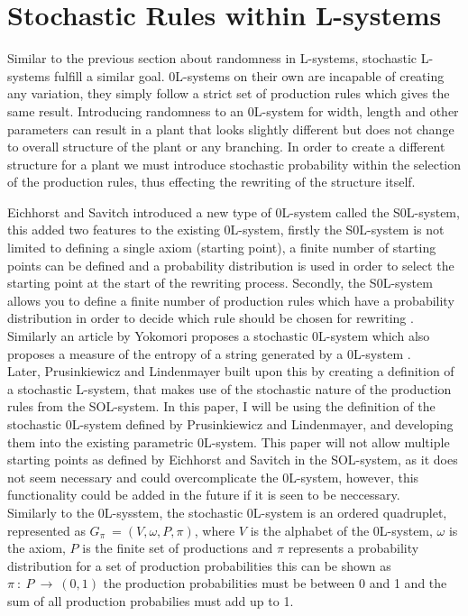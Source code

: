 \section{Stochastic Rules within L-systems} \label{Stochastic L-system Subsection}

Similar to the previous section about randomness in L-systems, stochastic L-systems fulfill a similar goal. 0L-systems on their own are incapable of creating any variation, they simply follow a strict set of production rules which gives the same result. Introducing randomness to an 0L-system for width, length and other parameters can result in a plant that looks slightly different but does not change to overall structure of the plant or any branching. In order to create a different structure for a plant we must introduce stochastic probability within the selection of the production rules, thus effecting the rewriting of the structure itself.

Eichhorst and Savitch introduced a new type of 0L-system called the S0L-system, this added two features to the existing 0L-system, firstly the S0L-system is not limited to defining a single axiom (starting point), a finite number of starting points can be defined and a probability distribution is used in order to select the starting point at the start of the rewriting process. Secondly, the S0L-system allows you to define a finite number of production rules which have a probability distribution in order to decide which rule should be chosen for rewriting \cite{eichhorst1980growth}. Similarly an article by Yokomori proposes a stochastic 0L-system which also proposes a measure of the entropy of a string generated by a 0L-system \cite{yokomori1980stochastic}.\\
Later, Prusinkiewicz and Lindenmayer built upon this by creating a definition of a stochastic L-system, that makes use of the stochastic nature of the production rules from the SOL-system. In this paper, I will be using the definition of the stochastic 0L-system defined by Prusinkiewicz and Lindenmayer, and developing them into the existing parametric 0L-system. This paper will not allow multiple starting points as defined by Eichhorst and Savitch in the SOL-system, as it does not seem necessary and could overcomplicate the 0L-system, however, this functionality could be added in the future if it is seen to be neccessary. \\
Similarly to the 0L-sysstem, the stochastic 0L-system is an ordered quadruplet, represented as $G_\pi~ = (V, \omega, P, \pi)$, where $V$ is the alphabet of the 0L-system, $\omega$ is the axiom, $P$ is the finite set of productions and $\pi$ represents a probability distribution for a set of production probabilities this can be shown as $\pi~ :~ P~ \rightarrow~ (0, 1)$ the production probabilities must be between 0 and 1 and the sum of all production probabilies must add up to 1.

